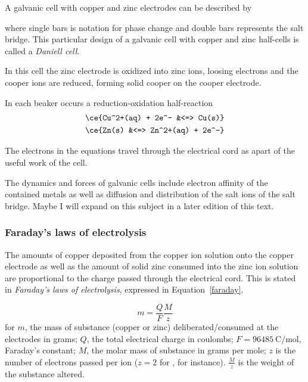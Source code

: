 \documentclass[../mit-general-chemistry.tex]{subfiles}
\begin{document}
A galvanic cell with copper and zinc electrodes can be described by


where single bars is notation for phase change and double bars
represents the salt bridge. This particular design of a galvanic cell
with copper and zinc half-cells is called a {\em Daniell cell}.

In this cell the zinc electrode is oxidized into zinc ions, loosing
electrons and the cooper ions are reduced, forming solid cooper on the
cooper electrode.

In each beaker occurs a reduction-oxidation half-reaction
\begin{align*}
  \ce{Cu^2+(aq) + 2e^- &<=> Cu(s)} \\
  \ce{Zn(s) &<=> Zn^2+(aq) + 2e^-} \\
\end{align*}

The electrons in the equations travel through the electrical cord as
apart of the useful work of the cell.

The dynamics and forces of galvanic cells include electron affinity of
the contained metals as well as diffusion and distribution of the
salt ions of the salt bridge. Maybe I will expand on this subject in a
later edition of this text.



\subsubsection{Faraday's laws of electrolysis}

The amounts of copper deposited from the copper ion solution onto the
copper electrode as well as the amount of solid zinc consumed into the
zinc ion solution are proportional to the charge passed through the
electrical cord. This is stated in {\em Faraday's laws of
  electrolysis}, expressed in Equation~\ref{faraday}.

\begin{equation}\label{faraday}
  m = \frac{Q}{F}\frac{M}{z}
\end{equation}
for $m$, the mass of substance (copper or zinc) deliberated/consumed
at the electrodes in grams; $Q$, the total electrical charge in
coulombs; $F = \SI{96485}{\coulomb\per\mol}$, Faraday's constant; $M$,
the molar mass of substance in grams per mole; $z$ is the number of
electrons passed per ion ($z = 2$ for , for
instance). $\frac{M}{z}$ is the weight of the substance altered.
\end{document}
